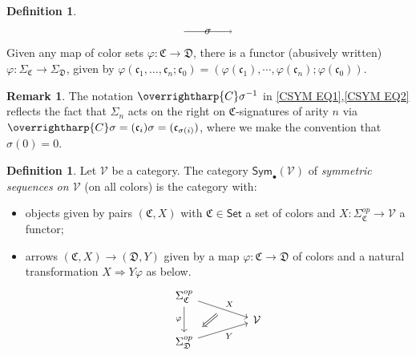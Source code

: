 \documentclass[a4paper,10pt
 ,final
]{article}%
\numberwithin{equation}{section}
\numberwithin{figure}{section}
\theoremstyle{definition} %
\newtheorem{definition}[equation]{Definition}%
\newtheorem{remark}[equation]{Remark}%
\newcommand{\vect}[1]{\text{\overrightharp{\ensuremath{#1}}}}
\newcommand{\1}{\ensuremath{\mathbbm 1}}%
\begin{document}
\begin{definition}
\begin{equation}
\begin{tikzpicture}
	\draw[->] (1.5,0.8) -- node{$\sigma$} (3,0.8);
	\end{tikzpicture}
	\end{equation}
	Given any map of color sets $\varphi \colon \mathfrak{C} \to \mathfrak{D}$,
	there is a functor (abusively written)
	$\varphi \colon \Sigma_{\mathfrak{C}} \to \Sigma_{\mathfrak{D}}$,
	given by 
	$\varphi (\mathfrak c_1, \dots, \mathfrak c_n; \mathfrak c_0) = (\varphi(\mathfrak c_1),\cdots,\varphi(\mathfrak c_n);\varphi(\mathfrak c_0))$. 
\end{definition}


\begin{remark}\label{GLOBSIG REM}
	The notation $\vect{C} \sigma^{-1}$
	in \eqref{CSYM EQ1},\eqref{CSYM EQ2}
	reflects the fact that $\Sigma_n$
	acts on the right on $\mathfrak{C}$-signatures of arity $n$
	via 
	$\vect{C} \sigma = (\mathfrak{c}_i)\sigma = 
	(\mathfrak{c}_{\sigma(i)})$,
	where we make the convention that $\sigma(0)=0$.
\end{remark}



\begin{definition}\label{CSSYM DEF}
	Let $\mathcal{V}$ be a category.
	The category $\mathsf{Sym}_\bullet(\mathcal{V})$ of
	\textit{symmetric sequences on $\mathcal{V}$} 
	(on all colors) is the category with:
	\begin{itemize}
		\item objects given by pairs $(\mathfrak C, X)$ with
		$\mathfrak{C} \in \mathsf{Set}$ a set of colors and
		$X \colon \Sigma_{\mathfrak{C}}^{op} \to \mathcal{V}$ a functor;
		\item arrows $(\mathfrak C, X) \to (\mathfrak D, Y)$ given by a map 
		$\varphi \colon \mathfrak{C} \to \mathfrak{D}$ of colors and a natural transformation $X \Rightarrow Y \varphi$ as below.
	\begin{equation}\label{CSSYM EQ}
		\begin{tikzcd}[row sep = tiny, column sep = 45pt]
		\Sigma_{\mathfrak{C}}^{op} \arrow[dr, "X"{name=U}] 
		\arrow{dd}[swap]{\varphi}
	\\
		& \mathcal{V}
	\\
		|[alias=V]| \Sigma_{\mathfrak{D}}^{op} \arrow[ur, "Y"']
		\arrow[Leftarrow, from=V, to=U,shorten >=0.25cm,shorten <=0.25cm]
		\end{tikzcd}
	\end{equation}
	\end{itemize}
\end{definition}
\end{document}
